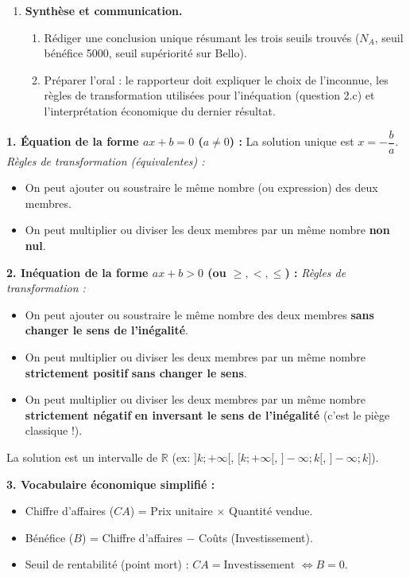 \documentclass[11pt]{article}
\newcounter{popsec}
\newcounter{popsub}
\newcommand{\courssub}[1]{%
  \stepcounter{popsub}%
  \par\vspace{9pt}\noindent{\popxbold\fontsize{11.5}{13}\selectfont\color{popink}{\color{poporange}\thepopsec.\thepopsub}\hspace{6pt}#1}\par\nopagebreak\vspace{4pt}
}
\begin{document}
\begin{enumerate}
    \item \textbf{Synthèse et communication.}
    \begin{enumerate}
        \item Rédiger une conclusion unique résumant les trois seuils trouvés ($N_A$, seuil bénéfice 5000, seuil supériorité sur Bello).
        \item Préparer l'oral : le rapporteur doit expliquer le choix de l'inconnue, les règles de transformation utilisées pour l'inéquation (question 2.c) et l'interprétation économique du dernier résultat.
    \end{enumerate}
\end{enumerate}

\courssub{Ressources à mobiliser}
\begin{aretenir}
\textbf{1. Équation de la forme $ax + b = 0$ ($a \neq 0$) :}
La solution unique est $x = -\dfrac{b}{a}$.
\emph{Règles de transformation (équivalentes) :}
\begin{itemize}
    \item On peut ajouter ou soustraire le même nombre (ou expression) des deux membres.
    \item On peut multiplier ou diviser les deux membres par un même nombre \textbf{non nul}.
\end{itemize}

\textbf{2. Inéquation de la forme $ax + b > 0$ (ou $\geq, <, \leq$) :}
\emph{Règles de transformation :}
\begin{itemize}
    \item On peut ajouter ou soustraire le même nombre des deux membres \textbf{sans changer le sens de l'inégalité}.
    \item On peut multiplier ou diviser les deux membres par un même nombre \textbf{strictement positif} \textbf{sans changer le sens}.
    \item On peut multiplier ou diviser les deux membres par un même nombre \textbf{strictement négatif} \textbf{en inversant le sens de l'inégalité} (c'est le piège classique !).
\end{itemize}
La solution est un intervalle de $\mathbb{R}$ (ex: $]k; +\infty[$, $[k; +\infty[$, $]-\infty; k[$, $]-\infty; k]$).

\textbf{3. Vocabulaire économique simplifié :}
\begin{itemize}
    \item Chiffre d'affaires ($CA$) = Prix unitaire $\times$ Quantité vendue.
    \item Bénéfice ($B$) = Chiffre d'affaires $-$ Coûts (Investissement).
    \item Seuil de rentabilité (point mort) : $CA = \text{Investissement}$ $\Leftrightarrow B = 0$.
\end{itemize}
\end{aretenir}
\end{document}
